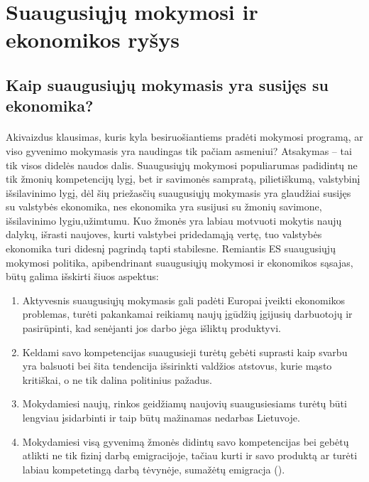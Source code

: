 \documentclass[12pt,a4paper, titlepage]{article}
\begin{document}
\section{Suaugusiųjų mokymosi ir ekonomikos ryšys}

\subsection{Kaip suaugusiųjų mokymasis yra susijęs su ekonomika?}
\paragraph{}
	Akivaizdus klausimas, kuris kyla besiruošiantiems pradėti mokymosi programą, ar  viso gyvenimo mokymasis yra naudingas tik pačiam asmeniui? Atsakymas – tai tik visos didelės naudos dalis. Suaugusiųjų mokymosi populiarumas padidintų ne tik žmonių kompetencijų lygį, bet ir savimonės sampratą, pilietiškumą, valstybinį išsilavinimo lygį, dėl šių priežasčių suaugusiųjų mokymasis yra glaudžiai susijęs su valstybės ekonomika, nes ekonomika yra susijusi su žmonių savimone, išsilavinimo lygiu,užimtumu. Kuo žmonės yra labiau motvuoti mokytis naujų dalykų, išrasti naujoves, kurti valstybei pridedamąją vertę, tuo valstybės ekonomika turi didesnį pagrindą tapti stabilesne.
	 Remiantis ES suaugusiųjų mokymosi politika, apibendrinant suaugusiųjų mokymosi ir ekonomikos sąsajas, būtų galima išskirti šiuos aspektus: 

\begin{enumerate}

\item Aktyvesnis suaugusiųjų mokymasis gali padėti Europai įveikti ekonomikos problemas, turėti pakankamai reikiamų naujų įgūdžių įgijusių darbuotojų ir pasirūpinti, kad senėjanti jos darbo jėga išliktų produktyvi. 
\item Keldami savo kompetencijas suaugusieji turėtų gebėti suprasti kaip svarbu yra balsuoti bei šita tendencija išsirinkti valdžios atstovus, kurie mąsto kritiškai, o ne tik dalina politinius pažadus.
\item Mokydamiesi naujų, rinkos geidžiamų naujovių suaugusiesiams turėtų būti lengviau įsidarbinti ir taip būtų mažinamas nedarbas Lietuvoje.
\item Mokydamiesi visą gyvenimą žmonės didintų savo kompetencijas bei gebėtų atlikti ne tik fizinį darbą emigracijoje, tačiau kurti ir savo produktą ar turėti labiau kompetetingą darbą tėvynėje, sumažėtų emigracja (\cite{bonjean_2019}).

\end{enumerate}
\end{document}
